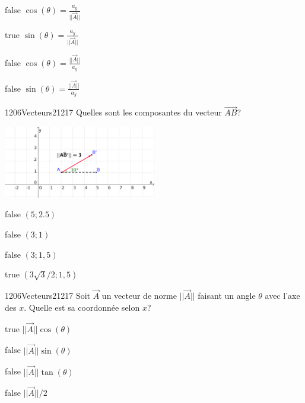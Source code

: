 \documentclass[11pt]{article}
\begin{document}
            \begin{reponses}
            	\item[false] $\cos(\theta)=\frac{a_y}{||\vec{A}||}$
            	\item[true] $\sin(\theta)=\frac{a_y}{||\vec{A}||}$
                \item[false] $\cos(\theta)=\frac{||\vec{A}||}{a_y}$
                \item[false] $\sin(\theta)=\frac{||\vec{A}||}{a_y}$
            \end{reponses}

            \begin{question}{1206}{Vecteurs}{2}{1217}
                Quelles sont les composantes du vecteur $\vec{AB}$?\\
                \begin{center}
                	\includegraphics[width=0.5\textwidth]{Philippe/Figures_Philippe/vecteurs_4_6.png}
                \end{center}
            \end{question}

            \begin{reponses}
                \item[false] $(5;2.5)$
                \item[false] $(3;1)$
                \item[false] $(3;1,5)$
                \item[true] $(3\sqrt{3}/2;1,5)$
            \end{reponses}
        
        	\begin{question}{1206}{Vecteurs}{2}{1217}
				Soit $\vec{A}$ un vecteur de norme $||\vec{A}||$ faisant un angle $\theta$ avec l'axe des $x$. Quelle est sa coordonnée selon $x$?
            \end{question}

            \begin{reponses}
            	\item[true] $||\vec{A}||\cos(\theta)$
            	\item[false] $||\vec{A}||\sin(\theta)$
                \item[false] $||\vec{A}||\tan(\theta)$
                \item[false] $||\vec{A}||/2$
            \end{reponses}
        
\end{document}
